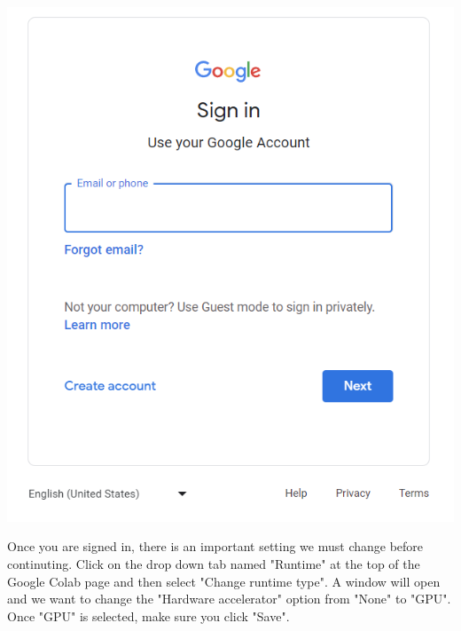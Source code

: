 \documentclass[11pt]{report}
\begin{document}
\begin{center}
    \includegraphics[scale=0.5]{signinup.png}
\end{center}

Once you are signed in, there is an important setting we must change before continuting. Click on the drop down tab named "Runtime" at the top of the Google Colab page and then select "Change runtime type". A window will open and we want to change the "Hardware accelerator" option from "None" to "GPU". Once "GPU" is selected, make sure you click "Save".
\end{document}
